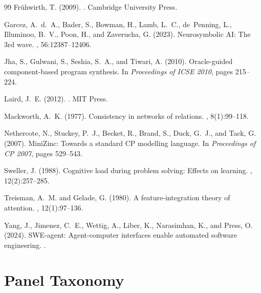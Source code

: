 \documentclass[11pt,a4paper]{article}
\begin{document}
\begin{thebibliography}{99}
Fr{\"u}hwirth, T. (2009).
.
\newblock Cambridge University Press.

Garcez, A.~d.~A., Bader, S., Bowman, H., Lamb, L.~C., de~Penning, L.,
Illuminoo, B.~V., Poon, H., and Zaverucha, G. (2023).
\newblock Neurosymbolic AI: The 3rd wave.
, 56:12387--12406.

Jha, S., Gulwani, S., Seshia, S.~A., and Tiwari, A. (2010).
\newblock Oracle-guided component-based program synthesis.
\newblock In {\em Proceedings of ICSE 2010}, pages 215--224.

Laird, J.~E. (2012).
.
\newblock MIT Press.

Mackworth, A.~K. (1977).
\newblock Consistency in networks of relations.
, 8(1):99--118.

Nethercote, N., Stuckey, P.~J., Becket, R., Brand, S., Duck, G.~J.,
and Tack, G. (2007).
\newblock MiniZinc: Towards a standard CP modelling language.
\newblock In {\em Proceedings of CP 2007}, pages 529--543.

Sweller, J. (1988).
\newblock Cognitive load during problem solving: Effects on learning.
, 12(2):257--285.

Treisman, A.~M. and Gelade, G. (1980).
\newblock A feature-integration theory of attention.
, 12(1):97--136.

Yang, J., Jimenez, C.~E., Wettig, A., Liber, K., Narasimhan, K.,
and Press, O. (2024).
\newblock SWE-agent: Agent-computer interfaces enable automated
software engineering.
.

\end{thebibliography}

\appendix

\section{Panel Taxonomy}\label{app:panels}
\end{document}
